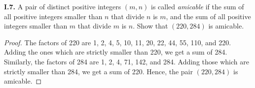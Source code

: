 \documentclass[12pt]{amsart}
\newenvironment{statement}[1]{\smallskip\noindent\color[rgb]{.6627, .3529, .6314} {\bf #1.}}{}
\theoremstyle{definition}
\theoremstyle{remark}
\begin{document}
\begin{statement}{I.7}
A pair of distinct positive integers $(m, n)$ is called \emph{amicable} if the sum of all positive integers smaller than $n$ that divide $n$ is $m$, and the sum of all positive integers smaller than $m$ that divide $m$ is $n$.
Show that $(220, 284)$ is amicable.
\end{statement}

\begin{proof}
The factors of 220 are 1, 2, 4, 5, 10, 11, 20, 22, 44, 55, 110, and 220.
Adding the ones which are strictly smaller than 220, we get a sum of 284.
Similarly, the factors of 284 are 1, 2, 4, 71, 142, and 284.
Adding those which are strictly smaller than 284, we get a sum of 220.
Hence, the pair $(220, 284)$ is amicable.
\end{proof}
\end{document}

